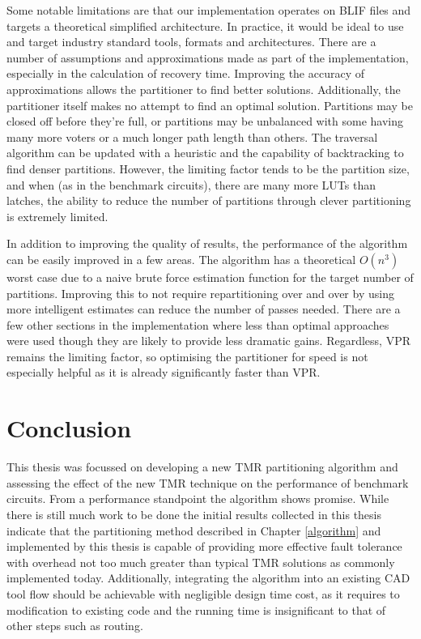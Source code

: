 \documentclass[12pt,final,oneside]{dwThesis} %
\begin{document}
   Some notable limitations are that our implementation operates on \gls{BLIF}
   files and targets a theoretical simplified architecture. In practice, it
   would be ideal to use and target industry standard tools, formats and
   architectures.  There are a number of assumptions and approximations made as
   part of the implementation, especially in the calculation of recovery time.
   Improving the accuracy of approximations allows the partitioner to find
   better solutions. Additionally, the partitioner itself makes no attempt to
   find an optimal solution. Partitions may be closed off before they're full,
   or partitions may be unbalanced with some having many more voters or a much
   longer path length than others.  The traversal algorithm can be updated with
   a heuristic and the capability of backtracking to find denser partitions.
   However, the limiting factor tends to be the partition size, and when (as in
   the benchmark circuits), there are many more \glspl{LUT} than latches, the
   ability to reduce the number of partitions through clever partitioning is
   extremely limited.
   
   In addition to improving the quality of results, the performance of the algorithm can be easily improved in a few areas.
   The algorithm has a theoretical $O(n^3)$ worst case due to a naive brute force estimation function for the target number of partitions.
   Improving this to not require repartitioning over and over by using more intelligent estimates can reduce the number of passes needed.
   There are a few other sections in the implementation where less than optimal approaches were used though they are likely to provide less dramatic gains.
   Regardless, \gls{VPR} remains the limiting factor, so optimising the partitioner for speed is not especially helpful as it is already significantly faster than \gls{VPR}.


   \chapter{Conclusion}
   This thesis was focussed on developing a new TMR
   partitioning algorithm and assessing the effect of the new \gls{TMR}
   technique on the performance of benchmark circuits. From a performance
   standpoint the algorithm shows promise. While there is still much work to be
   done the initial results collected in this thesis indicate that the
   partitioning method described in Chapter \ref{algorithm} and implemented by this
   thesis is capable of providing more effective fault tolerance with overhead
   not too much greater than typical \gls{TMR} solutions as commonly
   implemented today. Additionally, integrating the algorithm into an existing \gls{CAD} tool flow 
   should be achievable with negligible design time cost, as it requires to modification to existing code and
   the running time is insignificant to that of other steps such as routing.
\end{document}
